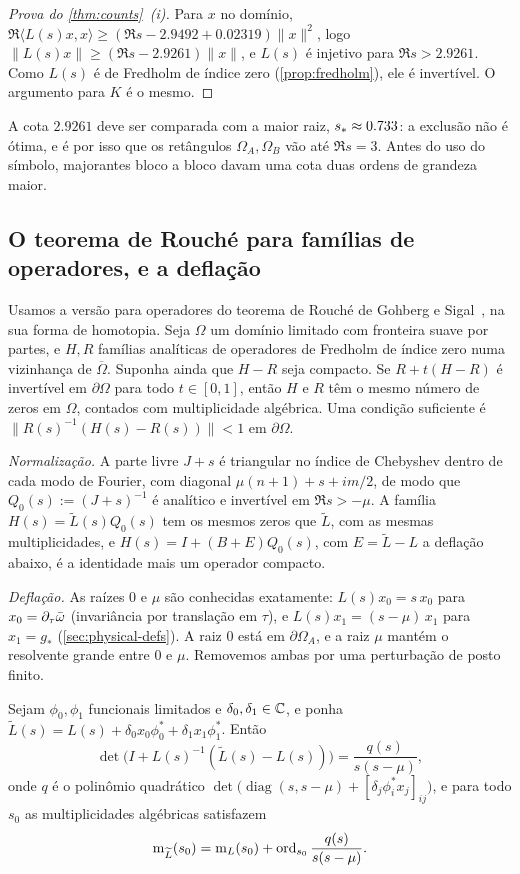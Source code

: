 \begin{proof}[Prova do \cref{thm:counts}~(i)]
Para $x$ no domínio, $\Re\langle L(s)x,x\rangle\ge(\Re s-2.9492+0.02319)\|x\|^2$, logo
$\|L(s)x\|\ge(\Re s-2.9261)\|x\|$, e $L(s)$ é injetivo para $\Re s>2.9261$. Como $L(s)$ é de Fredholm de
índice zero (\cref{prop:fredholm}), ele é invertível. O argumento para $K$ é o mesmo.
\end{proof}

A cota $2.9261$ deve ser comparada com a maior raiz, $s_{\ast}\approx0.733$: a exclusão não é ótima,
e é por isso que os retângulos $\Omega_A,\Omega_B$ vão até $\Re s=3$. Antes do uso do símbolo, majorantes bloco a
bloco davam uma cota duas ordens de grandeza maior.

\subsection{O teorema de Rouch\'e para famílias de operadores, e a deflação}\label{sec:counting-rouche}

Usamos a versão para operadores do teorema de Rouch\'e de Gohberg e Sigal~\cite{GohbergSigal1971}, na sua
forma de homotopia. Seja $\Omega$ um domínio limitado com fronteira suave por partes, e $H,R$ famílias analíticas de
operadores de Fredholm de índice zero numa vizinhança de $\overline\Omega$. Suponha ainda que $H-R$ seja compacto. Se
$R+t(H-R)$ é invertível em $\partial\Omega$ para todo $t\in[0,1]$, então $H$ e $R$ têm o mesmo número de zeros em $\Omega$, contados com
multiplicidade algébrica. Uma condição suficiente é $\|R(s)^{-1}(H(s)-R(s))\|<1$ em $\partial\Omega$.

\emph{Normalização.} A parte livre $J+s$ é triangular no índice de Chebyshev dentro de cada modo de Fourier, com
diagonal $\mu(n+1)+s+im/2$, de modo que $Q_0(s):=(J+s)^{-1}$ é analítico e invertível em $\Re s>-\mu$. A família
$H(s)=\widetilde L(s)Q_0(s)$ tem os mesmos zeros que $\widetilde L$, com as mesmas multiplicidades, e
$H(s)=I+(B+E)Q_0(s)$, com $E=\widetilde L-L$ a deflação abaixo, é a identidade mais um operador compacto.

\emph{Deflação.} As raízes $0$ e $\mu$ são conhecidas exatamente: $L(s)x_0=s\,x_0$ para $x_0=\partial_\tau\bar\omega$
(invariância por translação em $\tau$), e $L(s)x_1=(s-\mu)\,x_1$ para $x_1=g_*$ (\cref{sec:physical-defs}). A
raiz $0$ está em $\partial\Omega_A$, e a raiz $\mu$ mantém o resolvente grande entre $0$ e $\mu$. Removemos
ambas por uma perturbação de posto finito.

\begin{lemma}\label{lem:brauer}
Sejam $\phi_0,\phi_1$ funcionais limitados e $\delta_0,\delta_1\in\mathbb{C}$, e ponha
$\widetilde L(s)=L(s)+\delta_0x_0\phi_0^*+\delta_1x_1\phi_1^*$. Então
\[
  \det\big(I+L(s)^{-1}(\widetilde L(s)-L(s))\big)=\frac{q(s)}{s(s-\mu)},
\]
onde $q$ é o polinômio quadrático $\det\big(\operatorname{diag}(s,s-\mu)+[\delta_j\phi_i^*x_j]_{ij}\big)$, e
para todo $s_0$ as multiplicidades algébricas satisfazem
\[
  \operatorname{m}_{\widetilde L}(s_0)=\operatorname{m}_L(s_0)+\operatorname{ord}_{s_0}\frac{q(s)}{s(s-\mu)} .
\]
\end{lemma}

